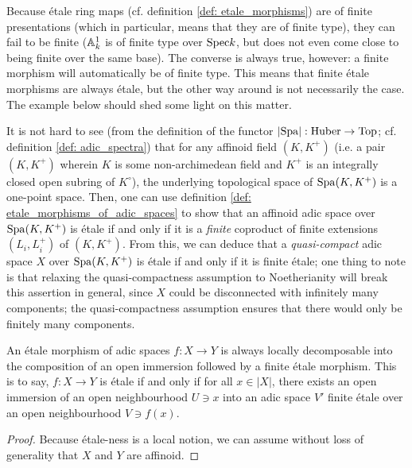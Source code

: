                     \begin{remark} \label{remark: finite_etale_implies_etale}
                        Because \'etale ring maps (cf. definition \ref{def: etale_morphisms}) are of finite presentations (which in particular, means that they are of finite type), they can fail to be finite ($\mathbb{A}^1_k$ is of finite type over $\mathrm{Spec} k$, but does not even come close to being finite over the same base). The converse is always true, however: a finite morphism will automatically be of finite type. This means that finite \'etale morphisms are always \'etale, but the other way around is not necessarily the case. The example below should shed some light on this matter.
                    \end{remark}
                    \begin{example} \label{example: adic_space_etale_over_affinoid_fields}
                        It is not hard to see (from the definition of the functor $|\mathrm{Spa}|: \mathrm{Huber} \to \mathrm{Top}$; cf. definition \ref{def: adic_spectra}) that for any affinoid field $(K, K^+)$ (i.e. a pair $(K, K^+)$ wherein $K$ is some non-archimedean field and $K^+$ is an integrally closed open subring of $K^{\circ}$), the underlying topological space of $\mathrm{Spa}(K, K^+)$ is a one-point space. Then, one can use definition \ref{def: etale_morphisms_of_adic_spaces} to show that an affinoid adic space over $\mathrm{Spa}(K, K^+)$ is \'etale if and only if it is a \textit{finite} coproduct of finite extensions $(L_i, L_i^+)$ of $(K, K^+)$. From this, we can deduce that a \textit{quasi-compact} adic space $X$ over $\mathrm{Spa}(K, K^+)$ is \'etale if and only if it is finite \'etale; one thing to note is that relaxing the quasi-compactness assumption to Noetherianity will break this assertion in general, since $X$ could be disconnected with infinitely many components; the quasi-compactness assumption ensures that there would only be finitely many components.
                    \end{example}
                    
                    \begin{proposition} \label{prop: factorisations_of_etale_morphisms_of_adic_spaces}
                        An \'etale morphism of adic spaces $f: X \to Y$ is always locally decomposable into the composition of an open immersion followed by a finite \'etale morphism. This is to say, $f: X \to Y$ is \'etale if and only if for all $x \in |X|$, there exists an open immersion of an open neighbourhood $U \ni x$ into an adic space $V'$ finite \'etale over an open neighbourhood $V \ni f(x)$.
                    \end{proposition}
                        \begin{proof}
                            Because \'etale-ness is a local notion, we can assume without loss of generality that $X$ and $Y$ are affinoid.
                        \end{proof}
                    
